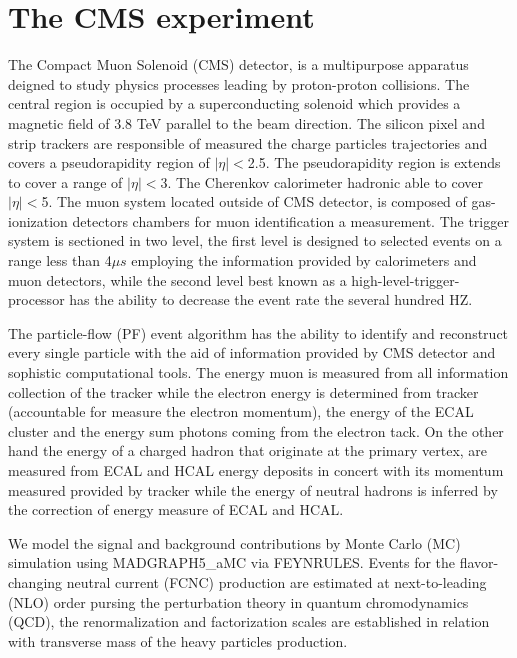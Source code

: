 \section{The CMS experiment}
\label{sec:CMS_intro}
The Compact Muon Solenoid (CMS) \cite{301} detector, is a multipurpose apparatus deigned to study physics processes leading by proton-proton collisions. The central region is occupied by a superconducting solenoid which provides a magnetic field of 3.8 TeV parallel to the beam direction. The silicon pixel and strip trackers are responsible of measured the charge particles trajectories and covers a pseudorapidity region of $|\eta| <$2.5. The pseudorapidity region is extends to cover a range of $|\eta|<$3. The Cherenkov calorimeter hadronic able to cover $|\eta|<$5. The muon system located outside of CMS detector, is composed of gas-ionization detectors chambers for muon identification a measurement. The trigger system is sectioned in two level, the first level is designed to selected events on a range less than 4$\mu s$ employing the information provided by calorimeters and muon detectors, while the second level best known as a high-level-trigger-processor has the ability to decrease the event rate the several hundred HZ. 

The particle-flow (PF) event algorithm has the ability to identify and reconstruct every single particle with the aid of information provided by CMS detector and sophistic computational tools. The energy muon is measured from all information collection of the tracker while the electron energy is determined from tracker (accountable for measure the electron momentum), the energy of the ECAL cluster and the energy sum photons coming from the electron tack. On the other hand the energy of a charged hadron that originate at the primary vertex, are measured from ECAL and HCAL energy deposits in concert with its momentum measured provided by tracker while the energy of neutral hadrons is inferred by the correction of energy measure of ECAL and HCAL. 

We model the signal and background contributions by Monte Carlo (MC) simulation using MADGRAPH5\_aMC via FEYNRULES. Events for the flavor-changing neutral current (FCNC) production are estimated at next-to-leading (NLO) order pursing the perturbation theory in quantum chromodynamics (QCD), the renormalization and factorization scales are established in relation with transverse mass of the heavy particles production. 

\clearpage

